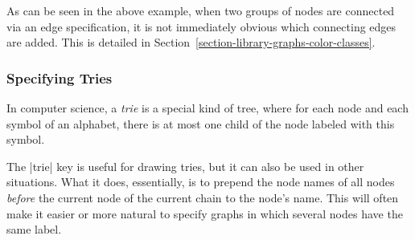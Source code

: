 As can be seen in the above example, when two groups of nodes are connected via
an edge specification, it is not immediately obvious which connecting edges are
added. This is detailed in Section~\ref{section-library-graphs-color-classes}.


\subsubsection{Specifying Tries}

In computer science, a \emph{trie} is a special kind of tree, where for each
node and each symbol of an alphabet, there is at most one child of the node
labeled with this symbol.

The |trie| key is useful for drawing tries, but it can also be used in other
situations. What it does, essentially, is to prepend the node names of all
nodes \emph{before} the current node of the current chain to the node's name.
This will often make it easier or more natural to specify graphs in which
several nodes have the same label.

